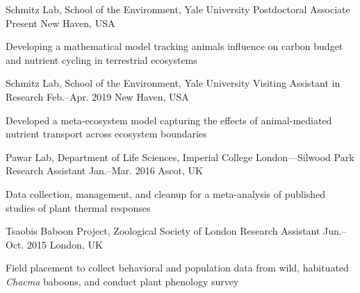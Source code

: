 

\begin{cventries}

  \cventry
    {Schmitz Lab, School of the Environment, Yale University} %
    {Postdoctoral Associate} %
    {Present} %
    {New Haven, USA} %
    {
      \begin{cvitems} %
        \item {Developing a mathematical model tracking animals influence on carbon budget and nutrient cycling in terrestrial ecosystems}
      \end{cvitems} 
    }

  \cventry
    {Schmitz Lab, School of the Environment, Yale University} %
    {Visiting Assistant in Research} %
    {Feb.--Apr. 2019} %
    {New Haven, USA} %
    {
      \begin{cvitems} %
        \item {Developed a meta-ecosystem model capturing the effects of animal-mediated nutrient transport across ecosystem boundaries}
      \end{cvitems}  
    }

  \cventry
    {Pawar Lab, Department of Life Sciences, Imperial College London---Silwood Park} %
    {Research Assistant} %
    {Jan.--Mar. 2016} %
    {Ascot, UK} %
    {
      \begin{cvitems} %
        \item {Data collection, management, and cleanup for a meta-analysis of published studies of plant thermal responses}
      \end{cvitems}  
    }

  \cventry
    {Tsaobis Baboon Project, Zoological Society of London} %
    {Research Assistant} %
    {Jun.--Oct. 2015} %
    {London, UK} %
    {
       \begin{cvitems} %
        \item {Field placement to collect behavioral and population data from wild, habituated \textit{Chacma} baboons, and conduct plant phenology survey}
      \end{cvitems}  
    }


\end{cventries}
